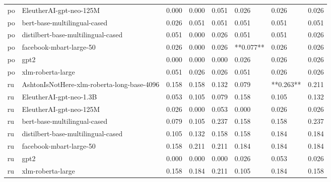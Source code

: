 \begin{tabular}{llllllll}
      po &                    EleutherAI-gpt-neo-125M & 0.000 &                     0.000 &                 0.051 &                  0.026 &                                   0.026 &     0.026 \\
      po &               bert-base-multilingual-cased & 0.026 &                     0.051 &                 0.051 &                  0.051 &                                   0.051 &     0.051 \\
      po &         distilbert-base-multilingual-cased & 0.051 &                     0.000 &                 0.026 &                  0.051 &                                   0.051 &     0.026 \\
      po &                    facebook-mbart-large-50 & 0.026 &                     0.000 &                 0.026 &              **0.077** &                                   0.026 &     0.026 \\
      po &                                       gpt2 & 0.000 &                     0.000 &                 0.000 &                  0.026 &                                   0.026 &     0.026 \\
      po &                          xlm-roberta-large & 0.051 &                     0.026 &                 0.026 &                  0.051 &                                   0.026 &     0.026 \\
      ru & AshtonIsNotHere-xlm-roberta-long-base-4096 & 0.158 &                     0.158 &                 0.132 &                  0.079 &                               **0.263** &     0.211 \\
      ru &                    EleutherAI-gpt-neo-1.3B & 0.053 &                     0.105 &                 0.079 &                  0.158 &                                   0.105 &     0.132 \\
      ru &                    EleutherAI-gpt-neo-125M & 0.026 &                     0.000 &                 0.053 &                  0.000 &                                   0.026 &     0.026 \\
      ru &               bert-base-multilingual-cased & 0.079 &                     0.105 &                 0.237 &                  0.158 &                                   0.158 &     0.237 \\
      ru &         distilbert-base-multilingual-cased & 0.105 &                     0.132 &                 0.158 &                  0.158 &                                   0.184 &     0.184 \\
      ru &                    facebook-mbart-large-50 & 0.158 &                     0.211 &                 0.211 &                  0.184 &                                   0.184 &     0.184 \\
      ru &                                       gpt2 & 0.000 &                     0.000 &                 0.000 &                  0.026 &                                   0.053 &     0.026 \\
      ru &                          xlm-roberta-large & 0.158 &                     0.184 &                 0.211 &                  0.105 &                                   0.184 &     0.158 \\
\bottomrule
\end{tabular}

